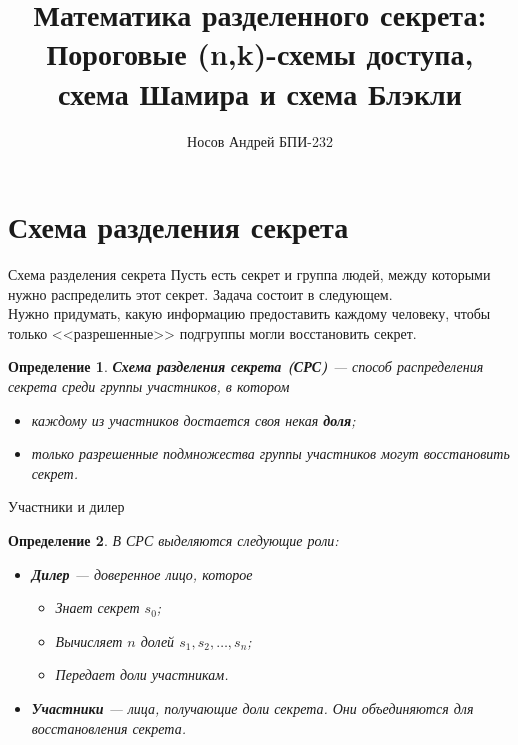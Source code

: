 \documentclass{beamer}
\title[Математика разделенного секрета]{Математика разделенного секрета:\\ Пороговые (n,k)-схемы доступа,\\ схема Шамира и схема Блэкли}
\author[Носов Андрей]{Носов Андрей БПИ-232}
\date{}
\institute{}
\newtheorem{define}{Определение}
\begin{document}
\begin{frame}
    \titlepage
\end{frame}


\section{Схема разделения секрета}
\begin{frame}{Схема разделения секрета}
    Пусть есть секрет и группа людей, между которыми нужно распределить этот секрет. Задача состоит в следующем. \\Нужно придумать, какую информацию предоставить каждому человеку, чтобы только <<разрешенные>> подгруппы могли восстановить секрет.
    \begin{define}
        \textbf{Схема разделения секрета (СРС)} --- способ распределения секрета среди группы участников, в котором
        \begin{itemize}
            \item каждому из участников достается своя некая \textbf{доля};
            \item только разрешенные подмножества группы участников могут восстановить секрет.
        \end{itemize}
    \end{define}
\end{frame}

\begin{frame}{Участники и дилер}
    \begin{define}
        В СРС выделяются следующие роли:
        \begin{itemize}
            \item \textbf{Дилер} --- доверенное лицо, которое
            \begin{itemize}
                \item Знает секрет \( s_0 \);
                \item Вычисляет \( n \) долей \( s_1, s_2, \dots, s_n \);
                \item Передает доли участникам.
            \end{itemize}
            \item \textbf{Участники} --- лица, получающие доли секрета. Они объединяются для восстановления секрета.
        \end{itemize}
    \end{define}
\end{frame}
\end{document}
